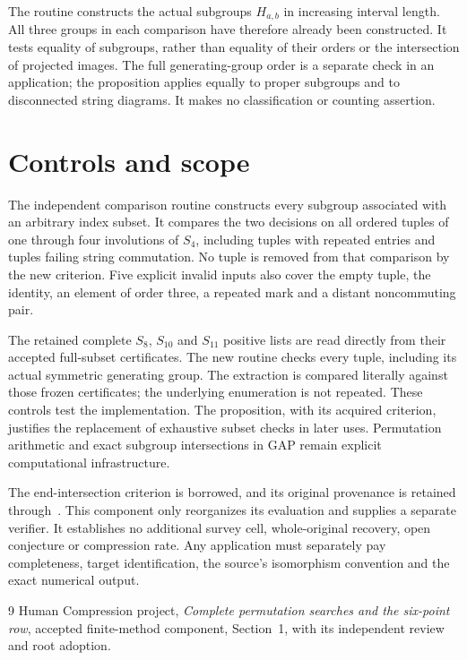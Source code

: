 \documentclass[11pt,a4paper]{article}
\begin{document}
The routine constructs the actual subgroups $H_{a,b}$ in increasing
interval length. All three groups in each comparison have therefore
already been constructed. It tests equality of subgroups, rather than
equality of their orders or the intersection of projected images.
The full generating-group order is a separate check in an application;
the proposition applies equally to proper subgroups and to disconnected
string diagrams. It makes no classification or counting assertion.

\section*{Controls and scope}
The independent comparison routine constructs every subgroup associated
with an arbitrary index subset. It compares the two decisions on all
ordered tuples of one through four involutions of $S_4$, including tuples
with repeated entries and tuples failing string commutation. No tuple
is removed from that comparison by the new criterion. Five explicit
invalid inputs also cover the empty tuple, the identity, an element of
order three, a repeated mark and a distant noncommuting pair.

The retained complete $S_8$, $S_{10}$ and $S_{11}$ positive lists are
read directly from their accepted full-subset certificates. The new
routine checks every tuple, including its actual symmetric generating
group. The extraction is compared literally against those frozen
certificates; the underlying enumeration is not repeated. These controls
test the implementation. The proposition, with its acquired criterion,
justifies the replacement of exhaustive subset checks in later uses.
Permutation arithmetic and exact subgroup intersections in GAP remain
explicit computational infrastructure.

The end-intersection criterion is borrowed, and its original provenance
is retained through~\cite{method}. This component only reorganizes its
evaluation and supplies a separate verifier. It establishes no additional
survey cell, whole-original recovery, open conjecture or compression rate.
Any application must separately pay completeness, target identification,
the source's isomorphism convention and the exact numerical output.

\begin{thebibliography}{9}\small
{} Human Compression project, \emph{Complete permutation
searches and the six-point row}, accepted finite-method component,
Section~1, with its independent review and root adoption.
\end{thebibliography}
\end{document}

